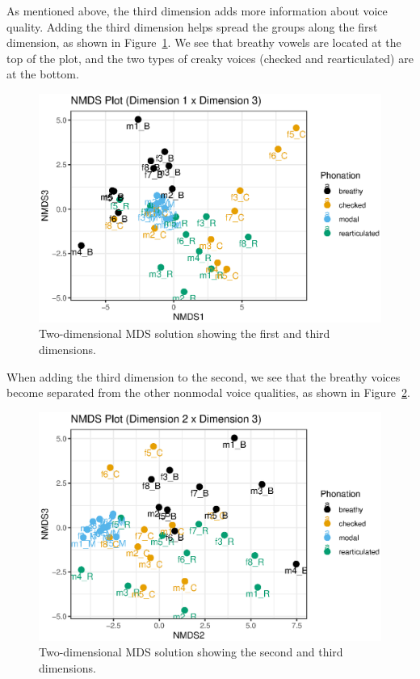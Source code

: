 As mentioned above, the third dimension adds more information about voice quality. Adding the third dimension helps spread the groups along the first dimension, as shown in Figure~\ref{fig:nmds13}. We see that breathy vowels are located at the top of the plot, and the two types of creaky voices (checked and rearticulated) are at the bottom. 

\begin{figure}[!h]
        \centering
        \includegraphics[width = 0.9\linewidth]{images/nmds13.eps}
        \caption{Two-dimensional MDS solution showing the first and third dimensions.}
        \label{fig:nmds13}
\end{figure}
    
When adding the third dimension to the second, we see that the breathy voices become separated from the other nonmodal voice qualities, as shown in Figure~\ref{fig:nmds23}. 

\begin{figure}[!h]
    \centering
    \includegraphics[width = \linewidth]{images/nmds23.eps}
    \caption{Two-dimensional MDS solution showing the second and third dimensions.}
    \label{fig:nmds23}
\end{figure}


